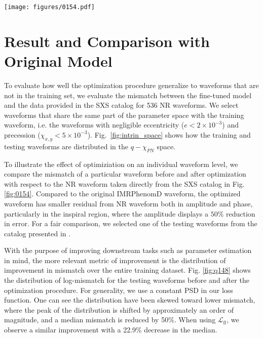 \documentclass[twocolumn]{aastex631}
\begin{document}
\begin{figure*}[t]
	\centering
	\texttt{[image: figures/0154.pdf]}
	\caption{Comparison between original and optimized IMRPhenomD waveforms.
	Here shows the SXS:BBH:0154 NR waveform, which has mass ratio $q=1$ and
	$\chi_1=\chi_2=-0.8$. The original mismatch is around $2.8\times10^{-4}$ and
	the optimized mismatch is around $5.3\times10^{-5}$. Top: It shows the
	amplitude and phase of NR, original IMRPhenomD and optimized IMRPhenomD
	waveform. Bottom: It shows the relative error of amplitudes between NR and
	IMRPhenomD waveforms, and the absolute error of phases between NR and
	IMRPhenomD waveforms}
	\label{fig:0154}
\end{figure*}

\section{Result and Comparison with Original Model} \label{sec:result}

To evaluate how well the optimization procedure generalize to waveforms that are
not in the training set, we evaluate the mismatch between the fine-tuned model
and the data provided in the SXS catalog for 536 NR waveforms. We select
waveforms that share the same part of the parameter space with the training
waveform, i.e. the waveforms with negligible eccentricity (${e<2\times10^{-3}}$)
and precession (${\chi_{x,y}<5\times10^{-3}}$). Fig.~\ref{fig:intrin_space}
shows how the training and testing waveforms are distributed in the
$q-\chi_{PN}$ space.

To illustrate the effect of optimiziation on an individual waveform level, we
compare the mismatch of a particular waveform before and after optimization with
respect to the NR waveform taken directly from the SXS catalog in Fig.
\ref{fig:0154}. Compared to the original IMRPhenomD waveform, the
optimized waveform has smaller residual from NR waveform both in amplitude and
phase, particularly in the inspiral region, where the amplitude displays a
$50\%$ reduction in error. For a fair comparison, we selected one of the testing
waveforms from the catalog presented in \citep{khan2016frequency}.

With the purpose of improving downstream tasks such as parameter estimation in
mind, the more relevant metric of improvement is the distribution of improvement
in mismatch over the entire training dataset. Fig. \ref{fig:q148} shows the
distribution of log-mismatch for the testing waveforms before and after the
optimization procedure. For generality, we use a constant PSD in our loss
function. One can see the distribution have been skewed toward lower mismatch,
where the peak of the distribution is shifted by approximately an order of
magnitude, and a median mismatch is reduced by 50\%. When using
$\mathcal{L}_{\mathrm{fl}}$, we observe a similar improvement with a 22.9\%
decrease in the median. 
\end{document}
